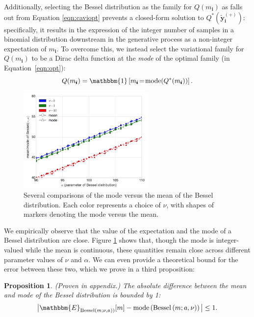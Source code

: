 \documentclass{article}
\newcommand{\subs}{\pmb{i}}
\newcommand{\ms}{m_{\subs}}
\newcommand{\yvtP}{\boldsymbol{\tilde{y}}_{\subs}^{(+)}}
\newcommand{\Bess}[1]{\textup{Bessel}\left( #1 \right)}
\newcommand{\teq}{\!=\!}
\newtheorem{proposition}{Proposition}
\begin{document}
  Additionally, selecting the Bessel distribution as the family for $Q(\ms)$ as
  falls out from Equation \ref{eqn:caviopt} prevents a closed-form solution to
  $Q^*(\yvtP)$: specifically, it results in the expression of the integer number
  of samples in a binomial distribution downstream in the generative process as
  a non-integer expectation of $\ms$. To overcome this, we instead select the
  variational family for $Q(\ms)$ to be a Dirac delta function at the
  \emph{mode} of the optimal family (in Equation~\ref{eqn:opt}):
  \begin{equation}
  Q(\ms) = \mathbbm{1} \left[\ms \teq \textrm{mode}(Q^*(\ms))\right].
  \end{equation}
  
  \begin{figure}[t]
    \centering
    \includegraphics[width=0.6\textwidth]{figures/besselmode}
    \caption{Several comparisons of the mode versus the mean of the Bessel
    distribution. Each color represents a choice of $\nu$, with shapes of
    markers denoting the mode versus the mean.}
    \label{fig:besselmode}
  \end{figure}

  We empirically observe that the value of the expectation and the mode of a
  Bessel distribution are close. Figure \ref{fig:besselmode} shows that, though
  the mode is integer-valued while the mean is continuous, these quantities
  remain close across different parameter values of $\nu$ and $\alpha$. We can
  even provide a theoretical bound for the error between these two, which we
  prove in a third proposition:

  \begin{proposition} (Proven in appendix.) The absolute
  difference between the mean and mode of the Bessel distribution is bounded by
  1:
    \[ \big| \mathbbm{E}_{\Bess{m; \nu, a})}[m]  - \textup{mode} \left(\Bess{m;
    a, \nu} \right) \big|  \leq 1. \]
  \end{proposition}
\end{document}
